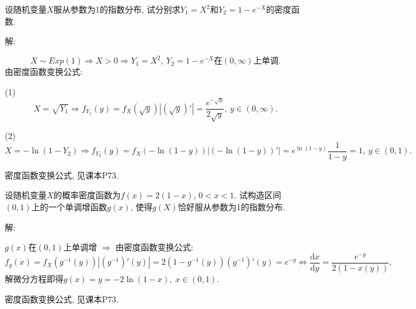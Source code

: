 \documentclass[standard]{ExBook}
\begin{document}
\begin{qitems}
    \begin{bbox}
    \begin{shaded}
        \qitem
设随机变量$X$服从参数为1的指数分布, 试分别求$Y_{1}=X^2$和$Y_{2}=1-e^{-X}$的密度函数.
    \end{shaded}
    \end{bbox}

\vspace{-5em}

    \begin{bbox}
解: 

$$X\sim Exp(1) \Longrightarrow X>0 \Longrightarrow Y_{1}=X^2,\ Y_{2}=1-e^{-X}\text{在}(0,\infty)上单调.$$
由密度函数变换公式:

(1) $$X=\sqrt{Y_1} \Longrightarrow f_{Y_1}(y)=f_{X}(\sqrt{y})|(\sqrt{y})'|=\displaystyle\frac{e^{-\sqrt{y}}}{2\sqrt{y}},\ y\in(0,\infty).$$
    \end{bbox}

\vspace{-5em}

    \begin{bbox}
(2) $$X=-\ln(1-Y_2) \Longrightarrow f_{Y_2}(y)=f_{X}(-\ln(1-y))|(-\ln(1-y))'|=e^{\ln(1-y)}\frac{1}{1-y}=1,\ y\in(0,1).$$

\textcolor{themeColor}{\selectfont {} 密度函数变换公式, 见课本P73.}
    \end{bbox}

\vspace{-5em}

    \begin{bbox}
    \begin{shaded}
        \qitem
设随机变量$X$的概率密度函数为$f(x)=2(1-x)$, $0<x<1$. 试构造区间$(0, 1)$上的一个单调增函数$g(x)$, 使得$g(X)$恰好服从参数为1的指数分布.
    \end{shaded}
    \end{bbox}

\vspace{-5em}

    \begin{bbox}
解: 

$g(x)$在$(0,1)$上单调增 $\Longrightarrow$ 由密度函数变换公式:
$$f_{g}(x)=f_{X}\left(g^{-1}(y)\right)\left| \left(g^{-1}\right)'(y) \right|=2\left(1-g^{-1}(y)\right)\left(g^{-1}\right)'(y)=e^{-y} \Longleftrightarrow \frac{\mathrm{d}x}{\mathrm{d}y}=\frac{e^{-y}}{2(1-x(y))},$$
解微分方程即得$g(x)=y=-2\ln(1-x),\ x\in(0,1)$.

\textcolor{themeColor}{\selectfont {} 密度函数变换公式, 见课本P73.}
    \end{bbox}


\end{qitems}
\end{document}
